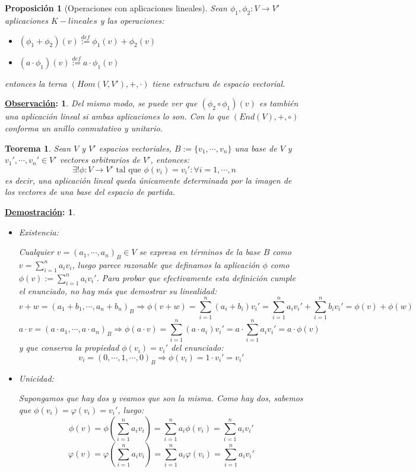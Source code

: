 \documentclass[10pt,a4paper,openright]{book}
\theoremstyle{break}
\newtheorem*{theo}{Teorema}
\newtheorem*{prop}{Proposición}
\newtheorem*{demo}{\underline{Demostración}:}
\newtheorem*{obs}{\underline{Observación}:}
\begin{document}
\begin{prop}[Operaciones con aplicaciones lineales]
Sean $\phi_1, \phi_2: V\longrightarrow V'$ aplicaciones $K-lineales$ y las operaciones:
\begin{itemize}
\item $(\phi_1+\phi_2)(v)\stackrel{def}{:=}\phi_1(v)+\phi_2(v)$
\item $(a\cdot \phi_1)(v)\stackrel{def}{:=}a\cdot \phi_1(v)$
\end{itemize}
entonces la terna $(Hom(V,V'),+,\cdot )$ tiene estructura de espacio vectorial.
\end{prop}

\begin{obs}
Del mismo modo, se puede ver que $(\phi_2 \circ \phi_1)(v)$ es también una aplicación lineal si ambas aplicaciones lo son. Con lo que $(End(V), +, \circ)$ conforma un anillo conmutativo y unitario.
\end{obs}

\begin{theo}
Sean $V$ y $V'$ espacios vectoriales, $B:=\{v_1, \cdots, v_n\}$ una base de $V$ y $v_1', \cdots, v_n'\in V'$ vectores arbitrarios de $V'$, entonces:
$$
\exists! \phi: V\longrightarrow V' \mbox{ tal que } \phi(v_i)=v_i': \forall i=1,\cdots,n
$$
es decir, una aplicación lineal queda únicamente determinada por la imagen de los vectores de una base del espacio de partida.
\end{theo}
\begin{demo}
\begin{itemize}
\item Existencia:

Cualquier $v=(a_1, \cdots, a_n)_B \in V$ se expresa en términos de la base $B$ como $v=\sum_{i=1}^n a_iv_i$, luego parece razonable que definamos la aplicación $\phi$ como $\phi(v) := \sum_{i=1}^na_iv_i'$. Para probar que efectivamente esta definición cumple el enunciado, no hay más que demostrar su linealidad:
$$
v+w = (a_1+b_1,\cdots, a_n+b_n)_B \Rightarrow \phi(v+w) = \sum_{i=1}^n (a_i+b_i)v_i' = \sum_{i=1}^na_iv_i' + \sum_{i=1}^nb_iv_i'=\phi(v)+\phi(w)
$$
$$
a\cdot v=(a\cdot a_1, \cdots, a\cdot a_n)_B\Rightarrow \phi(a\cdot v)=\sum_{i=1}^n(a\cdot a_i)v_i'=a\cdot \sum_{i=1}^na_iv_i'=a\cdot \phi(v)
$$
y que conserva la propiedad $\phi(v_i) = v_i'$ del enunciado:
$$
v_i=(0,\cdots,1,\cdots,0)_B\Rightarrow \phi(v_i)=1\cdot v_i'=v_i'
$$

\item Unicidad:

Supongamos que hay dos y veamos que son la misma. Como hay dos, sabemos que $\phi(v_i)=\varphi(v_i)=v_i'$, luego:
$$
\phi(v)=\phi\left(\sum_{i=1}^na_iv_i\right)=\sum_{i=1}^na_i\phi(v_i)=\sum_{i=1}^na_iv_i'
$$
$$
\varphi(v)=\varphi\left(\sum_{i=1}^na_iv_i\right)=\sum_{i=1}^na_i\varphi(v_i)=\sum_{i=1}^na_iv_i'
$$
\end{itemize}
\end{demo}
\end{document}

